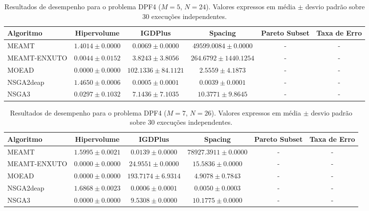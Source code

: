 \begin{table}[htpb]
\centering
\caption{Resultados de desempenho para o problema DPF4 ($M=5$, $N=24$). Valores expressos em média $\pm$ desvio padrão sobre 30 execuções independentes.}
\label{tab:DPF4_M5_N24}
\begin{tabular}{lccccc}
\hline\hline
Algoritmo & Hipervolume & IGDPlus & Spacing & Pareto Subset & Taxa de Erro \\
\hline
MEAMT & $1.4014 \pm 0.0000$ & $0.0069 \pm 0.0000$ & $49599.0084 \pm 0.0000$ & - & - \\
MEAMT-ENXUTO & $0.0044 \pm 0.0152$ & $3.8243 \pm 3.8056$ & $264.6792 \pm 1440.1254$ & - & - \\
MOEAD & $0.0000 \pm 0.0000$ & $102.1336 \pm 84.1121$ & $2.5559 \pm 4.1873$ & - & - \\
NSGA2deap & $1.4650 \pm 0.0006$ & $0.0005 \pm 0.0001$ & $0.0039 \pm 0.0001$ & - & - \\
NSGA3 & $0.0297 \pm 0.1032$ & $7.1436 \pm 7.1035$ & $10.3771 \pm 9.8645$ & - & - \\
\hline\hline
\end{tabular}
\end{table}

\begin{table}[htpb]
\centering
\caption{Resultados de desempenho para o problema DPF4 ($M=7$, $N=26$). Valores expressos em média $\pm$ desvio padrão sobre 30 execuções independentes.}
\label{tab:DPF4_M7_N26}
\begin{tabular}{lccccc}
\hline\hline
Algoritmo & Hipervolume & IGDPlus & Spacing & Pareto Subset & Taxa de Erro \\
\hline
MEAMT & $1.5995 \pm 0.0021$ & $0.0139 \pm 0.0000$ & $78927.3911 \pm 0.0000$ & - & - \\
MEAMT-ENXUTO & $0.0000 \pm 0.0000$ & $24.9551 \pm 0.0000$ & $15.5836 \pm 0.0000$ & - & - \\
MOEAD & $0.0000 \pm 0.0000$ & $193.7174 \pm 6.9314$ & $4.9078 \pm 0.7843$ & - & - \\
NSGA2deap & $1.6868 \pm 0.0023$ & $0.0006 \pm 0.0001$ & $0.0050 \pm 0.0003$ & - & - \\
NSGA3 & $0.0000 \pm 0.0000$ & $9.5308 \pm 0.0000$ & $10.1775 \pm 0.0000$ & - & - \\
\hline\hline
\end{tabular}
\end{table}

